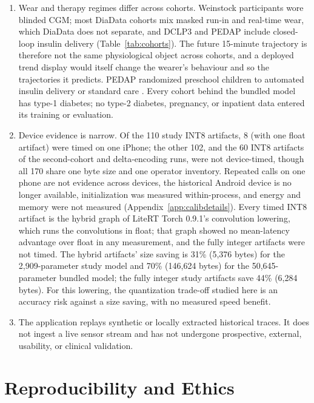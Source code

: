 \documentclass[10pt,twocolumn]{article}
\begin{document}
\begin{enumerate}
    \item Wear and therapy regimes differ across cohorts. Weinstock
    participants wore blinded CGM; most DiaData cohorts mix masked run-in
    and real-time wear, which DiaData does not separate, and DCLP3 and
    PEDAP include closed-loop insulin delivery (Table~\ref{tab:cohorts}).
    The future 15-minute trajectory is therefore not the same
    physiological object across cohorts, and a deployed trend display
    would itself change the wearer's behaviour and so the trajectories it
    predicts. PEDAP randomized preschool children to automated insulin
    delivery or standard care \cite{wadwa2023pedap}. Every cohort behind
    the bundled model has type-1 diabetes; no type-2 diabetes, pregnancy,
    or inpatient data entered its training or evaluation.
    \item Device evidence is narrow. Of the 110 study INT8 artifacts, 8
    (with one float artifact) were timed on one iPhone; the other 102, and
    the 60 INT8 artifacts of the second-cohort and delta-encoding runs, were
    not device-timed, though all 170 share one byte size and one operator
    inventory. Repeated calls on one phone are not evidence across
    devices, the historical Android device is no longer available,
    initialization was measured within-process, and energy and memory were
    not measured (Appendix~\ref{app:calibdetails}). Every timed INT8
    artifact is the hybrid graph of LiteRT Torch 0.9.1's convolution
    lowering, which runs the convolutions in float; that graph showed no
    mean-latency advantage over float in any measurement, and the fully
    integer artifacts were not timed. The hybrid artifacts' size saving is
    31\% (5,376 bytes) for the 2,909-parameter study model and 70\%
    (146,624 bytes) for the 50,645-parameter bundled model; the fully
    integer study artifacts save 44\% (6,284 bytes). For this lowering, the quantization
    trade-off studied here is an accuracy risk against a size saving, with
    no measured speed benefit.
    \item The application replays synthetic or locally extracted
    historical traces. It does not ingest a live sensor stream and has
    not undergone prospective, external, usability, or clinical
    validation.
\end{enumerate}

\section{Reproducibility and Ethics}
\label{sec:repro}
\end{document}
